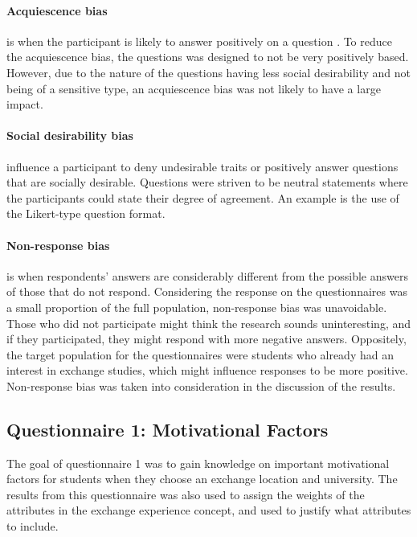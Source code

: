 \paragraph{Acquiescence bias} is when the participant is likely to answer positively on a question \cite{cronbach1946response}. To reduce the acquiescence bias, the questions was designed to not be very positively based. However, due to the nature of the questions having less social desirability and not being of a sensitive type, an acquiescence bias was not likely to have a large impact. 

\paragraph{Social desirability bias} influence a participant to deny undesirable traits or positively answer questions that are socially desirable. Questions were striven to be neutral statements where the participants could state their degree of agreement. An example is the use of the Likert-type question format. 


\paragraph{Non-response bias} is when respondents' answers are considerably different from the possible answers of those that do not respond. Considering the response on the questionnaires was a small proportion of the full population, non-response bias was unavoidable. Those who did not participate might think the research sounds uninteresting, and if they participated, they might respond with more negative answers. Oppositely, the target population for the questionnaires were students who already had an interest in exchange studies, which might influence responses to be more positive. Non-response bias was taken into consideration in the discussion of the results.



\subsection{Questionnaire 1: Motivational Factors}\label{sec:questionnaire_1}

The goal of questionnaire 1 was to gain knowledge on important motivational factors for students when they choose an exchange location and university. The results from this questionnaire was also used to assign the weights of the attributes in the exchange experience concept, and used to justify what attributes to include. 


